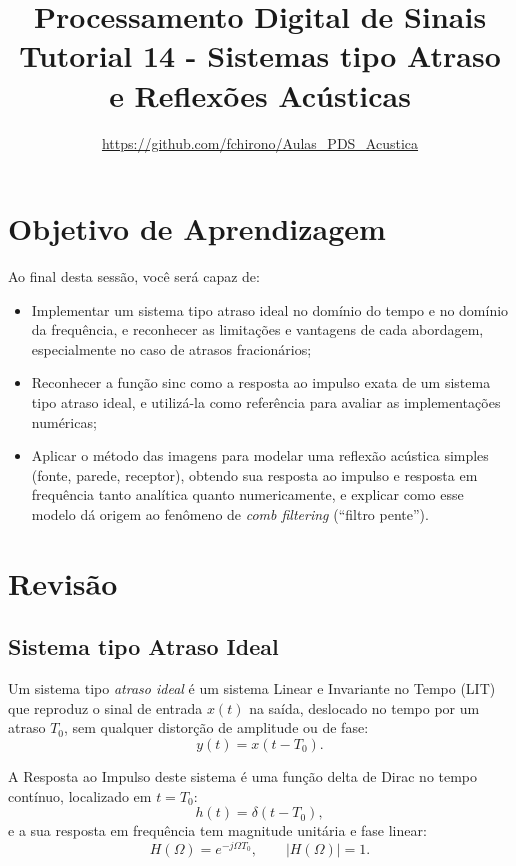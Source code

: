 \documentclass[a4paper,twoside,12pt]{article}
\title{\vspace{-2cm} Processamento Digital de Sinais\\ Tutorial 14 - Sistemas tipo Atraso e Reflexões Acústicas}
\author{\url{https://github.com/fchirono/Aulas_PDS_Acustica}}
\begin{document}
	\date{}
	\maketitle
	
	\section*{Objetivo de Aprendizagem}
	Ao final desta sessão, você será capaz de:
	\begin{itemize}
		\item Implementar um sistema tipo atraso ideal no domínio do tempo e no domínio da frequência, e reconhecer as limitações e vantagens de cada abordagem, especialmente no caso de atrasos fracionários;
		\item Reconhecer a função sinc como a resposta ao impulso exata de um sistema tipo atraso ideal, e utilizá-la como referência para avaliar as implementações numéricas;
		\item Aplicar o método das imagens para modelar uma reflexão acústica simples (fonte, parede, receptor), obtendo sua resposta ao impulso e resposta em frequência tanto analítica quanto numericamente, e explicar como esse modelo dá origem ao fenômeno de \emph{comb filtering} (``filtro pente'').
	\end{itemize}
	
	\begingroup
	\let\clearpage\relax
	\tableofcontents
	\endgroup
	
	\section{Revisão}
	
	\subsection{Sistema tipo Atraso Ideal}
	
	Um sistema tipo \emph{atraso ideal} é um sistema Linear e Invariante no Tempo (LIT) que reproduz o sinal de entrada $x(t)$ na saída, deslocado no tempo por um atraso $T_0$, sem qualquer distorção de amplitude ou de fase:
	\begin{equation}
		y(t) = x(t - T_0).
	\end{equation}
	
	A Resposta ao Impulso deste sistema é uma  função delta de Dirac no tempo contínuo, localizado em $t=T_0$:
	\begin{equation}
		h(t) = \delta(t - T_0),
	\end{equation}
	e a sua resposta em frequência tem magnitude unitária e fase linear:
	\begin{equation}
		H(\Omega) = e^{-j \Omega T_0}, \qquad |H(\Omega)| = 1.
	\end{equation}
	
\end{document}
